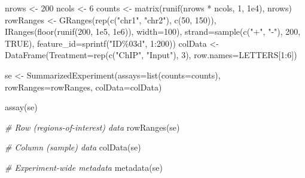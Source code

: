 \documentclass[
]{book}
\newenvironment{Shaded}{\begin{snugshade}}{\end{snugshade}}
\newcommand{\AttributeTok}[1]{\textcolor[rgb]{0.77,0.63,0.00}{#1}}
\newcommand{\CommentTok}[1]{\textcolor[rgb]{0.56,0.35,0.01}{\textit{#1}}}
\newcommand{\ConstantTok}[1]{\textcolor[rgb]{0.00,0.00,0.00}{#1}}
\newcommand{\DecValTok}[1]{\textcolor[rgb]{0.00,0.00,0.81}{#1}}
\newcommand{\FloatTok}[1]{\textcolor[rgb]{0.00,0.00,0.81}{#1}}
\newcommand{\FunctionTok}[1]{\textcolor[rgb]{0.00,0.00,0.00}{#1}}
\newcommand{\NormalTok}[1]{#1}
\newcommand{\OtherTok}[1]{\textcolor[rgb]{0.56,0.35,0.01}{#1}}
\newcommand{\SpecialCharTok}[1]{\textcolor[rgb]{0.00,0.00,0.00}{#1}}
\newcommand{\StringTok}[1]{\textcolor[rgb]{0.31,0.60,0.02}{#1}}
\begin{document}
\begin{Shaded}
\begin{Highlighting}[]
\NormalTok{nrows }\OtherTok{\textless{}{-}} \DecValTok{200}
\NormalTok{ncols }\OtherTok{\textless{}{-}} \DecValTok{6}
\NormalTok{counts }\OtherTok{\textless{}{-}} \FunctionTok{matrix}\NormalTok{(}\FunctionTok{runif}\NormalTok{(nrows }\SpecialCharTok{*}\NormalTok{ ncols, }\DecValTok{1}\NormalTok{, }\FloatTok{1e4}\NormalTok{), nrows)}
\NormalTok{rowRanges }\OtherTok{\textless{}{-}} \FunctionTok{GRanges}\NormalTok{(}\FunctionTok{rep}\NormalTok{(}\FunctionTok{c}\NormalTok{(}\StringTok{"chr1"}\NormalTok{, }\StringTok{"chr2"}\NormalTok{), }\FunctionTok{c}\NormalTok{(}\DecValTok{50}\NormalTok{, }\DecValTok{150}\NormalTok{)),}
                     \FunctionTok{IRanges}\NormalTok{(}\FunctionTok{floor}\NormalTok{(}\FunctionTok{runif}\NormalTok{(}\DecValTok{200}\NormalTok{, }\FloatTok{1e5}\NormalTok{, }\FloatTok{1e6}\NormalTok{)), }\AttributeTok{width=}\DecValTok{100}\NormalTok{),}
                     \AttributeTok{strand=}\FunctionTok{sample}\NormalTok{(}\FunctionTok{c}\NormalTok{(}\StringTok{"+"}\NormalTok{, }\StringTok{"{-}"}\NormalTok{), }\DecValTok{200}\NormalTok{, }\ConstantTok{TRUE}\NormalTok{),}
                     \AttributeTok{feature\_id=}\FunctionTok{sprintf}\NormalTok{(}\StringTok{"ID\%03d"}\NormalTok{, }\DecValTok{1}\SpecialCharTok{:}\DecValTok{200}\NormalTok{))}
\NormalTok{colData }\OtherTok{\textless{}{-}} \FunctionTok{DataFrame}\NormalTok{(}\AttributeTok{Treatment=}\FunctionTok{rep}\NormalTok{(}\FunctionTok{c}\NormalTok{(}\StringTok{"ChIP"}\NormalTok{, }\StringTok{"Input"}\NormalTok{), }\DecValTok{3}\NormalTok{),}
                     \AttributeTok{row.names=}\NormalTok{LETTERS[}\DecValTok{1}\SpecialCharTok{:}\DecValTok{6}\NormalTok{])}

\NormalTok{se }\OtherTok{\textless{}{-}} \FunctionTok{SummarizedExperiment}\NormalTok{(}\AttributeTok{assays=}\FunctionTok{list}\NormalTok{(}\AttributeTok{counts=}\NormalTok{counts),}
                     \AttributeTok{rowRanges=}\NormalTok{rowRanges, }\AttributeTok{colData=}\NormalTok{colData)}

\FunctionTok{assay}\NormalTok{(se)}

\CommentTok{\# Row (regions{-}of{-}interest) data}
\FunctionTok{rowRanges}\NormalTok{(se)}

\CommentTok{\# Column (sample) data}
\FunctionTok{colData}\NormalTok{(se)}

\CommentTok{\# Experiment{-}wide metadata}
\FunctionTok{metadata}\NormalTok{(se)}
\end{Highlighting}
\end{Shaded}
\end{document}
